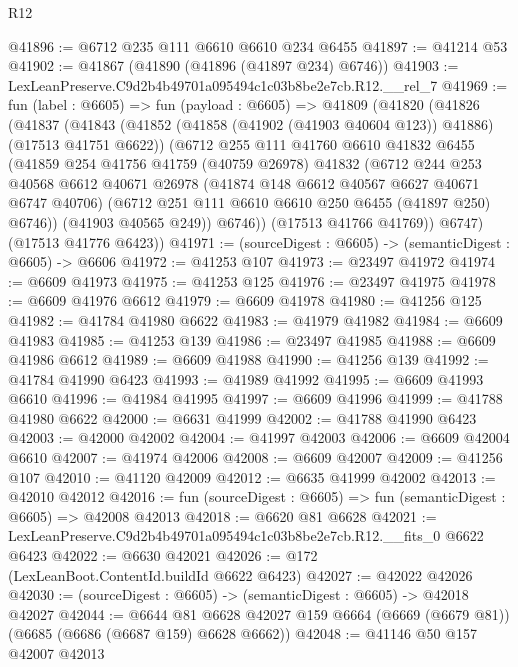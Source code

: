 \begin{lexlean}{R12}
\begin{coremodule}
@41896 := @6712 @235 @111 @6610 @6610 @234 @6455
@41897 := @41214 @53
@41902 := @41867 (@41890 (@41896 (@41897 @234) @6746))
@41903 := LexLeanPreserve.C9d2b4b49701a095494c1c03b8be2e7cb.R12.__rel_7
@41969 := fun (label : @6605) =>
  fun (payload : @6605) =>
  @41809
    (@41820
      (@41826
        (@41837
          (@41843
            (@41852 (@41858 (@41902 (@41903 @40604 @123)) @41886) (@17513 @41751 @6622))
            (@6712
              @255
              @111
              @41760
              @6610
              @41832
              @6455
              (@41859
                @254
                @41756
                @41759
                (@40759 @26978)
                @41832
                (@6712
                  @244
                  @253
                  @40568
                  @6612
                  @40671
                  @26978
                  (@41874 @148 @6612 @40567 @6627 @40671 @6747 @40706)
                  (@6712 @251 @111 @6610 @6610 @250 @6455 (@41897 @250) @6746))
                (@41903 @40565 @249))
              @6746))
          (@17513 @41766 @41769))
        @6747)
      (@17513 @41776 @6423))
@41971 := (sourceDigest : @6605) -> (semanticDigest : @6605) -> @6606
@41972 := @41253 @107
@41973 := @23497 @41972
@41974 := @6609 @41973
@41975 := @41253 @125
@41976 := @23497 @41975
@41978 := @6609 @41976 @6612
@41979 := @6609 @41978
@41980 := @41256 @125
@41982 := @41784 @41980 @6622
@41983 := @41979 @41982
@41984 := @6609 @41983
@41985 := @41253 @139
@41986 := @23497 @41985
@41988 := @6609 @41986 @6612
@41989 := @6609 @41988
@41990 := @41256 @139
@41992 := @41784 @41990 @6423
@41993 := @41989 @41992
@41995 := @6609 @41993 @6610
@41996 := @41984 @41995
@41997 := @6609 @41996
@41999 := @41788 @41980 @6622
@42000 := @6631 @41999
@42002 := @41788 @41990 @6423
@42003 := @42000 @42002
@42004 := @41997 @42003
@42006 := @6609 @42004 @6610
@42007 := @41974 @42006
@42008 := @6609 @42007
@42009 := @41256 @107
@42010 := @41120 @42009
@42012 := @6635 @41999 @42002
@42013 := @42010 @42012
@42016 := fun (sourceDigest : @6605) => fun (semanticDigest : @6605) => @42008 @42013
@42018 := @6620 @81 @6628
@42021 := LexLeanPreserve.C9d2b4b49701a095494c1c03b8be2e7cb.R12.__fits_0 @6622 @6423
@42022 := @6630 @42021
@42026 := @172 (LexLeanBoot.ContentId.buildId @6622 @6423)
@42027 := @42022 @42026
@42030 := (sourceDigest : @6605) -> (semanticDigest : @6605) -> @42018 @42027
@42044 := @6644
    @81
    @6628
    @42027
    @159
    @6664
    (@6669 (@6679 @81))
    (@6685 (@6686 (@6687 @159) @6628 @6662))
@42048 := @41146 @50 @157 @42007 @42013

\end{coremodule}
\end{lexlean}
